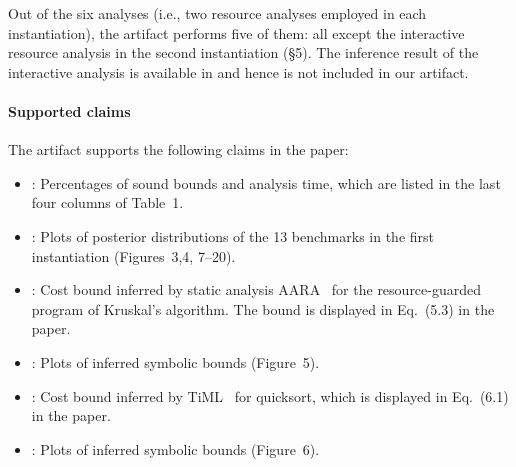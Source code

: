Out of the six analyses (i.e., two resource analyses employed in each
instantiation), the artifact performs five of them: all except the interactive
resource analysis in the second instantiation (\S5).
%
The inference result of the interactive analysis is available in
\citet{Chargueraud2019} and hence is not included in our artifact.

\paragraph{Supported claims}

The artifact supports the following claims in the paper:
\begin{itemize}
      \item {}: Percentages of sound
            bounds and analysis time, which are listed in the last four columns
            of Table~1.
      \item {}: Plots of posterior
            distributions of the 13 benchmarks in the first instantiation
            (Figures~3,4, 7--20).
      \item {}: Cost bound inferred by
            static analysis AARA~\citep{Hoffmann2011a,Hoffmann2017} for the
            resource-guarded program of Kruskal's algorithm.
            The bound is displayed in Eq.~(5.3) in the paper.
      \item {}: Plots of inferred symbolic
            bounds (Figure~5).
      \item {}: Cost bound inferred by
            TiML~\citep{WangWC17} for quicksort, which is displayed in Eq.~(6.1)
            in the paper.
      \item {}: Plots of inferred symbolic
            bounds (Figure~6).
\end{itemize}
